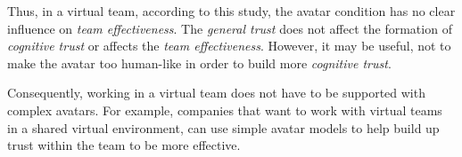 \documentclass[sigchi]{acmart}
\begin{document}
Thus, in a virtual team, according to this study, the avatar condition has no clear influence on \textit{team effectiveness}. The \textit{general trust} does not affect the formation of \textit{cognitive trust} or affects the \textit{team effectiveness}. However, it may be useful, not to make the avatar too human-like in order to build more \textit{cognitive trust}.

Consequently, working in a virtual team does not have to be supported with complex avatars. For example, companies that want to work with virtual teams in a shared virtual environment, can use simple avatar models to help build up trust within the team to be more effective.





\appendix
\end{document}

